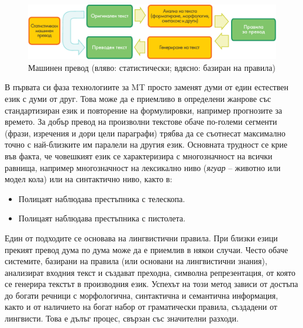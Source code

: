 \documentclass[]{../../metanetpaper}
\begin{document}
\begin{multicols}{2}
\begin{figure}[htb]
  \center
  \includegraphics[width=\textwidth]{../_media/bulgarian/machine_translation}
  \vspace{-2mm}
  \caption{Машинен превод (вляво: статистически; вдясно: базиран на правила)}
  \label{fig:mtarch_de}
\end{figure}

В първата си фаза технологиите за MT просто заменят думи от един естествен език с думи от друг. Това може да
 е приемливо в определени жанрове със стандартизиран език и повторение на формулировки, например прогнозите за времето.
 За добър превод на произволни текстове обаче
 по-големи  сегменти (фрази, изречения и дори цели параграфи) трябва да се съотнесат максимално точно с най-близките им паралели на другия
 език. Основната трудност се крие във факта, че
 човешкият език се характеризира с многозначност на 
всички равнища,
 например
 многозначност на лексикално ниво ({\it ягуар} – животно
 или модел кола) или на
 синтактично ниво, както в:

\begin{itemize}
\item Полицаят наблюдава престъпника с телескопа.
\item Полицаят наблюдава престъпника с пистолета.
\end{itemize}

Един от подходите се основава на лингвистични правила.
 При близки езици прекият превод дума по дума може да е приемлив в някои случаи. Често обаче системите,
 базирани на правила (или основани на лингвистични знания),
 анализират входния текст и създават преходна, символна
 репрезентация, от която се генерира текстът в
 производния език. Успехът на този метод зависи от
 достъпа до богати речници с морфологична, синтактична
 и семантична информация, както и от наличието на
 богат набор от граматически правила, създадени от лингвисти.
 Това е дълъг процес, свързан със значителни разходи.


\end{multicols}
\end{document}
